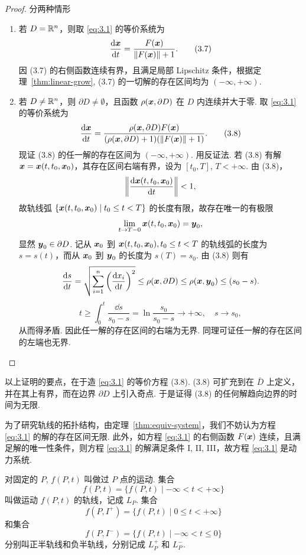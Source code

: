\begin{proof}
分两种情形
\begin{enumerate}
\item 若 $D = \mathbb{R}^n$，则取 \eqref{eq:3.1} 的等价系统为
\[
\frac{\mathrm{d} \boldsymbol{x}}{\mathrm{d} t} = \frac{F(\boldsymbol{x})}{\|F(\boldsymbol{x})\| + 1}. \tag{3.7}\label{eq:3.7}
\]
因 (3.7) 的右侧函数连续有界，且满足局部 Lipschitz 条件，根据定理~\ref{thm:linear-grow}, (3.7) 的一切解的存在区间均为 $(-\infty, +\infty)$.

\item 若 $D \neq \mathbb{R}^n$，则 $\partial D \neq \emptyset$，且函数 $\rho(\boldsymbol{x}, \partial D)$ 在 $D$ 内连续并大于零. 取 \eqref{eq:3.1} 的等价系统为
\[
\frac{\mathrm{d} \boldsymbol{x}}{\mathrm{d} t} = \frac{\rho(\boldsymbol{x}, \partial D) F(\boldsymbol{x})}{(\rho(\boldsymbol{x}, \partial D) + 1)(\|F(\boldsymbol{x})\| + 1)}. \tag{3.8}\label{eq:3.8}
\]
现证 (3.8) 的任一解的存在区间为 $(-\infty, +\infty)$. 用反证法. 若 (3.8) 有解 $\boldsymbol{x} = \boldsymbol{x}(t, t_0, \boldsymbol{x}_0)$，其存在区间右端有界，设为 $[t_0, T]$, $T < +\infty$. 由 (3.8)，
\[
\left\|\frac{\mathrm{d} \boldsymbol{x}(t, t_0, \boldsymbol{x}_0)}{\mathrm{d} t}\right\| < 1,
\]
故轨线弧 $\{\boldsymbol{x}(t, t_0, \boldsymbol{x}_0) \mid t_0 \leq t < T\}$ 的长度有限，故存在唯一的有极限
\[
\lim_{t \to T-0} \boldsymbol{x}(t, t_0, \boldsymbol{x}_0) = \boldsymbol{y}_0,
\]
显然 $\boldsymbol{y}_0 \in \partial D$. 记从 $\boldsymbol{x}_0$ 到 $\boldsymbol{x}(t, t_0, \boldsymbol{x}_0), t_0 \leq t < T$ 的轨线弧的长度为 $s = s(t)$，而从 $\boldsymbol{x}_0$ 到 $\boldsymbol{y}_0$ 的长度为 $s(T) = s_0$. 由 (3.8) 则有
\[
\frac{\mathrm{d} s}{\mathrm{d} t} = \sqrt{\sum_{i=1}^n \left(\frac{\mathrm{d} x_i}{\mathrm{d} t}\right)^2} \leq \rho(\boldsymbol{x}, \partial D) \leq \rho(\boldsymbol{x}, \boldsymbol{y}_0) \leq (s_0 - s).
\]
\[
t \geq \int_0^t \frac{\dd s}{s_0 - s} = \ln\frac{s_0}{s_0 - s} \to +\infty, \quad s \to s_0,
\]
从而得矛盾. 因此任一解的存在区间的右端为无界. 同理可证任一解的存在区间的左端也无界.
\end{enumerate}
\end{proof}

以上证明的要点，在于造 \eqref{eq:3.1} 的等价方程 (3.8). (3.8) 可扩充到在 $\bar D$ 上定义，并在其上有界，而在边界 $\partial D$ 上引入奇点. 于是证得 (3.8) 的任何解趋向边界的时间为无限.

为了研究轨线的拓扑结构，由定理~\ref{thm:equiv-system}，我们不妨认为方程 \eqref{eq:3.1} 的解的存在区间无限. 此外，如方程 \eqref{eq:3.1} 的右侧函数 $F(\boldsymbol{x})$ 连续，且满足解的唯一性条件，则方程 \eqref{eq:3.1} 的解满足条件 I, II, III，故方程 \eqref{eq:3.1} 是动力系统.

对固定的 $P$, $f(P, t)$ 叫做过 $P$ 点的运动. 集合
\[
f(P, t) = \{f(P, t) \mid -\infty < t < +\infty\}
\]
叫做运动 $f(P, t)$ 的轨线，记成 $L_P$. 集合
\[
f(P, I^+) = \{f(P, t) \mid 0 \leq t < +\infty\}
\]
和集合
\[
f(P, I^-) = \{f(P, t) \mid -\infty < t \leq 0\}
\]
分别叫正半轨线和负半轨线，分别记成 $L_P^+$ 和 $L_P^-$.

